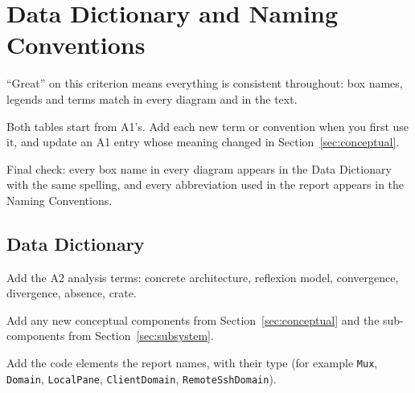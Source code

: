 \section{Data Dictionary and Naming Conventions}
\label{sec:data-dictionary}


\begin{requirements}
  \item ``Great'' on this criterion means everything is consistent throughout: box names, legends and terms match in every diagram and in the text.
  \item Both tables start from A1's. Add each new term or convention when you first use it, and update an A1 entry whose meaning changed in Section~\ref{sec:conceptual}.
  \item Final check: every box name in every diagram appears in the Data Dictionary with the same spelling, and every abbreviation used in the report appears in the Naming Conventions.
\end{requirements}

\subsection{Data Dictionary}
\label{sec:dictionary}

\begin{requirements}
  \item Add the A2 analysis terms: concrete architecture, reflexion model, convergence, divergence, absence, crate.
  \item Add any new conceptual components from Section~\ref{sec:conceptual} and the sub-components from Section~\ref{sec:subsystem}.
  \item Add the code elements the report names, with their type (for example \texttt{Mux}, \texttt{Domain}, \texttt{LocalPane}, \texttt{ClientDomain}, \texttt{RemoteSshDomain}).
\end{requirements}

